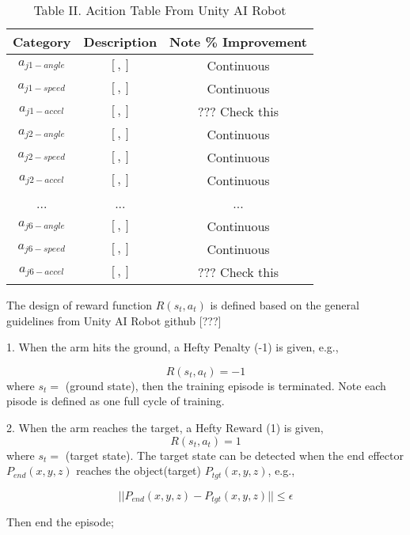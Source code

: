 \documentclass[conference]{IEEEtran}
\begin{document}
\begin{table}[H]  
\renewcommand{\arraystretch}{1.3} 
\caption{Table II. Acition Table From Unity AI Robot}
\label{state-Table1}
\centering 
\begin{tabular}{|c||c||c|}
\hline
Category     & Description    & Note    \% Improvement \\
\hline
$a_{j1-angle}$     & $[,]$ & Continuous \\
\hline
$a_{j1-speed}$     & $[,]$ & Continuous \\
\hline 
$a_{j1-accel}$     & $[,]$ & ??? Check this \\
\hline 
$a_{j2-angle}$     & $[,]$ & Continuous \\
\hline
$a_{j2-speed}$     & $[,]$ & Continuous \\
\hline 
$a_{j2-accel}$     & $[,]$ & Continuous \\
\hline 
...     & ... & ... \\
\hline 
$a_{j6-angle}$     & $[,]$ & Continuous \\
\hline
$a_{j6-speed}$     & $[,]$ & Continuous \\
\hline 
$a_{j6-accel}$     & $[,]$ & ??? Check this \\
\hline 
\end{tabular}
\end{table}

The design of reward function $R(s_t, a_t)$ is defined 
based on the general guidelines from Unity AI Robot github [???] 

1. When the arm hits the ground, a Hefty Penalty (-1) is 
given, e.g., 

\begin{equation}
R(s_t,a_t) = -1
\end{equation}
where $s_t =$ (ground state),  
then the training episode is terminated. 
Note each pisode is defined as one full cycle of training. 

2. When the arm reaches the target, a Hefty Reward (1) 
is given,  
\begin{equation}
R(s_t,a_t) = 1
\end{equation}
where $s_t =$ (target state). The 
target state can be detected when the end effector 
$P_{end}(x,y,z)$ 
reaches the object(target) $P_{tgt}(x,y,z)$, e.g., 

\begin{equation}
|| P_{end}(x,y,z) - P_{tgt}(x,y,z) || \leq \epsilon
\end{equation}

Then end the episode;
 
\end{document}
